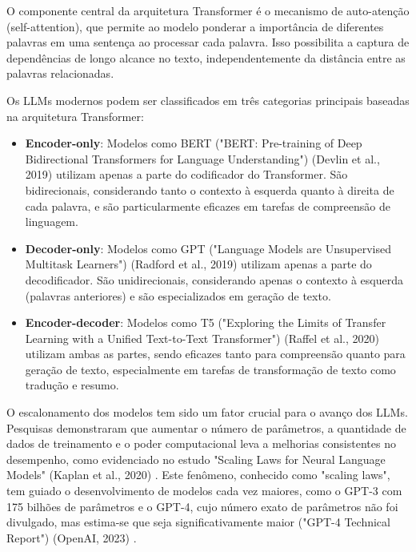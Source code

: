 \documentclass[tcc,capa]{texufpel}
\begin{document}
O componente central da arquitetura Transformer é o mecanismo de auto-atenção (self-attention), que permite ao modelo ponderar a importância de diferentes palavras em uma sentença ao processar cada palavra. Isso possibilita a captura de dependências de longo alcance no texto, independentemente da distância entre as palavras relacionadas.

Os LLMs modernos podem ser classificados em três categorias principais baseadas na arquitetura Transformer:

\begin{itemize}
    \item \textbf{Encoder-only}: Modelos como BERT ("BERT: Pre-training of Deep Bidirectional Transformers for Language Understanding") (Devlin et al., 2019) \cite{devlin2019bert} utilizam apenas a parte do codificador do Transformer. São bidirecionais, considerando tanto o contexto à esquerda quanto à direita de cada palavra, e são particularmente eficazes em tarefas de compreensão de linguagem.
    
    \item \textbf{Decoder-only}: Modelos como GPT ("Language Models are Unsupervised Multitask Learners") (Radford et al., 2019) \cite{radford2019language} utilizam apenas a parte do decodificador. São unidirecionais, considerando apenas o contexto à esquerda (palavras anteriores) e são especializados em geração de texto.
    
    \item \textbf{Encoder-decoder}: Modelos como T5 ("Exploring the Limits of Transfer Learning with a Unified Text-to-Text Transformer") (Raffel et al., 2020) \cite{raffel2020exploring} utilizam ambas as partes, sendo eficazes tanto para compreensão quanto para geração de texto, especialmente em tarefas de transformação de texto como tradução e resumo.
\end{itemize}

O escalonamento dos modelos tem sido um fator crucial para o avanço dos LLMs. Pesquisas demonstraram que aumentar o número de parâmetros, a quantidade de dados de treinamento e o poder computacional leva a melhorias consistentes no desempenho, como evidenciado no estudo "Scaling Laws for Neural Language Models" (Kaplan et al., 2020) \cite{kaplan2020scaling}. Este fenômeno, conhecido como "scaling laws", tem guiado o desenvolvimento de modelos cada vez maiores, como o GPT-3 com 175 bilhões de parâmetros e o GPT-4, cujo número exato de parâmetros não foi divulgado, mas estima-se que seja significativamente maior ("GPT-4 Technical Report") (OpenAI, 2023) \cite{openai2023gpt4}.
\end{document}
